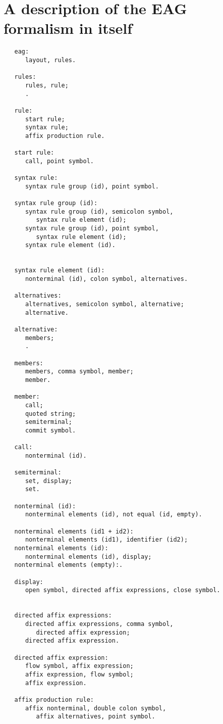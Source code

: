 \chapter{A description of the EAG formalism in itself}
\begin{verbatim}
   eag:
      layout, rules.

   rules:
      rules, rule;
      .

   rule:
      start rule;
      syntax rule;
      affix production rule.

   start rule:
      call, point symbol.

   syntax rule:
      syntax rule group (id), point symbol.

   syntax rule group (id):
      syntax rule group (id), semicolon symbol,
         syntax rule element (id);
      syntax rule group (id), point symbol,
         syntax rule element (id);
      syntax rule element (id).


   syntax rule element (id):
      nonterminal (id), colon symbol, alternatives.

   alternatives:
      alternatives, semicolon symbol, alternative;
      alternative.

   alternative:
      members;
      .

   members:
      members, comma symbol, member;
      member.

   member:
      call;
      quoted string;
      semiterminal;
      commit symbol.

   call:
      nonterminal (id).

   semiterminal:
      set, display;
      set.

   nonterminal (id):
      nonterminal elements (id), not equal (id, empty).

   nonterminal elements (id1 + id2):
      nonterminal elements (id1), identifier (id2); 
   nonterminal elements (id):
      nonterminal elements (id), display;
   nonterminal elements (empty):.

   display:
      open symbol, directed affix expressions, close symbol.


   directed affix expressions:
      directed affix expressions, comma symbol,
         directed affix expression;
      directed affix expression.

   directed affix expression:
      flow symbol, affix expression;
      affix expression, flow symbol;
      affix expression.

   affix production rule:
      affix nonterminal, double colon symbol,
         affix alternatives, point symbol.


\end{verbatim}
